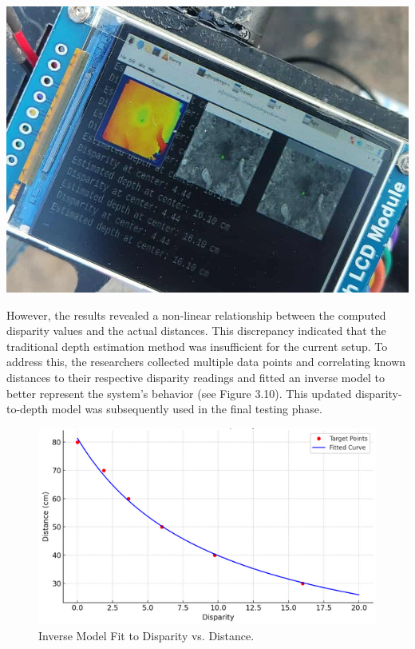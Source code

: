 \begin{center}
	\includegraphics[scale=0.30]{initialtest.jpg}
\end{center}

However, the results revealed a non-linear relationship between the computed disparity values and the actual distances. This discrepancy indicated that the traditional depth estimation method was insufficient for the current setup. To address this, the researchers collected multiple data points and correlating known distances to their respective disparity readings and fitted an inverse model to better represent the system's behavior (see Figure 3.10). This updated disparity-to-depth model was subsequently used in the final testing phase.

\begin{figure}[H]
	\centering
	\includegraphics[scale=0.55]{inversemodel.png}
	\caption{Inverse Model Fit to Disparity vs. Distance.\\}
	\label{fig:inverse}
\end{figure}




